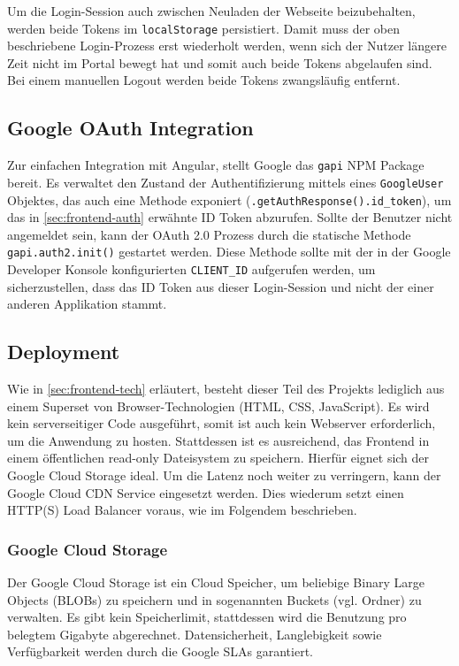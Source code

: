 \documentclass{article}
\begin{document}
Um die Login-Session auch zwischen Neuladen der Webseite beizubehalten, werden beide Tokens im \texttt{localStorage} persistiert. Damit muss der oben beschriebene Login-Prozess erst wiederholt werden, wenn sich der Nutzer längere Zeit nicht im Portal bewegt hat und somit auch beide Tokens abgelaufen sind. Bei einem manuellen Logout werden beide Tokens zwangsläufig entfernt.


\subsection{Google OAuth Integration}

Zur einfachen Integration mit Angular, stellt Google das \texttt{gapi} NPM Package bereit. Es verwaltet den Zustand der Authentifizierung mittels eines \texttt{GoogleUser} Objektes, das auch eine Methode exponiert (\texttt{.getAuthResponse().id\_token}), um das in \autoref{sec:frontend-auth} erwähnte ID Token abzurufen. Sollte der Benutzer nicht angemeldet sein, kann der OAuth 2.0 Prozess durch die statische Methode \texttt{gapi.auth2.init()} gestartet werden. Diese Methode sollte mit der in der Google Developer Konsole konfigurierten \texttt{CLIENT\_ID} aufgerufen werden, um sicherzustellen, dass das ID Token aus dieser Login-Session und nicht der einer anderen Applikation stammt.


\subsection{Deployment}

Wie in \autoref{sec:frontend-tech} erläutert, besteht dieser Teil des Projekts lediglich aus einem Superset von Browser-Technologien (HTML, CSS, JavaScript). Es wird kein serverseitiger Code ausgeführt, somit ist auch kein Webserver erforderlich, um die Anwendung zu hosten. Stattdessen ist es ausreichend, das Frontend in einem öffentlichen read-only Dateisystem zu speichern. Hierfür eignet sich der Google Cloud Storage ideal. Um die Latenz noch weiter zu verringern, kann der Google Cloud CDN Service eingesetzt werden. Dies wiederum setzt einen HTTP(S) Load Balancer voraus, wie im Folgendem beschrieben.


\subsubsection{Google Cloud Storage}

Der Google Cloud Storage ist ein Cloud Speicher, um beliebige Binary Large Objects (BLOBs) zu speichern und in sogenannten Buckets (vgl. Ordner) zu verwalten. Es gibt kein Speicherlimit, stattdessen wird die Benutzung pro belegtem Gigabyte abgerechnet. Datensicherheit, Langlebigkeit sowie Verfügbarkeit werden durch die Google SLAs garantiert.
\end{document}
